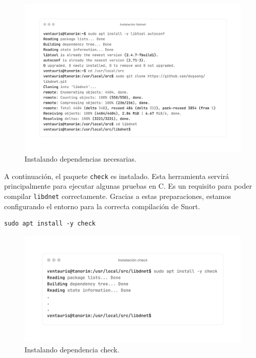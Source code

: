 \documentclass[11pt,a4paper,twoside]{report}
\begin{document}
\begin{figure}[H]
	\centering
	\includegraphics[scale=0.1]{instalacion_snort/1-1.png}
	\caption{Instalando dependencias necesarias.}
\end{figure}

\newpage

A continuación, el paquete \texttt{check} es instalado. Esta herramienta servirá principalmente para ejecutar algunas pruebas en C. Es un requisito para poder compilar \texttt{libdnet} correctamente. Gracias a estas preparaciones, estamos configurando el entorno para la correcta compilación de Snort.

\begin{lstlisting}[style=commandstyle, caption={Instalando dependencia check}]
	sudo apt install -y check
\end{lstlisting}

\begin{figure}[H]
	\centering
	\includegraphics[scale=0.12]{instalacion_snort/2-2.png}
	\caption{Instalando dependencia check.}
\end{figure}
\end{document}
